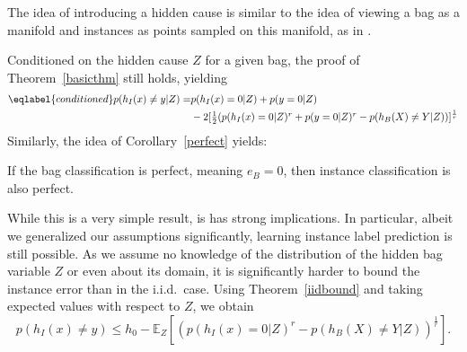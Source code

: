 The idea of introducing a hidden cause is similar to the idea of viewing a bag as a manifold and instances as points
sampled on this manifold, as in \citet{ICML2011Babenko_74}.

Conditioned on the hidden cause $Z$ for a given bag, the proof of Theorem~\ref{basicthm} still holds, yielding
\begin{align}\eqlabel{conditioned}
p(h_I(x) \neq y | Z) =&p(h_I(x)=0|Z) + p(y=0|Z)\\
&\textstyle- 2  [\frac{1}{2} ( p(h_I(x)=0|Z)^r + p(y=0|Z)^r
 - p(h_B(X) \neq Y|Z)) ]^\frac{1}{r}
\end{align}
Similarly, the idea of Corollary~\ref{perfect} yields:

\begin{corollary}\label{perfect}
If the bag classification is perfect, meaning $e_B=0$, then instance classification is also perfect.
\end{corollary}

While this is a very simple result, is has strong implications. In particular, albeit we generalized our
assumptions significantly, learning instance label prediction is still possible.
As we assume no knowledge of the distribution of the hidden bag variable $Z$ or even about its domain, it is significantly harder
to bound the instance error than in the i.i.d.\ case.
Using Theorem~\ref{iidbound} and taking expected values with respect to $Z$, we obtain
\begin{equation}
    p(h_I(x)\neq y)
    \leq h_0 - \mathbb{E}_Z \left [\left ( p(h_I(x)=0 | Z)^r - p(h_B(X)\neq Y|Z) \right ) ^ \frac{1}{r} \right ].
\end{equation}


